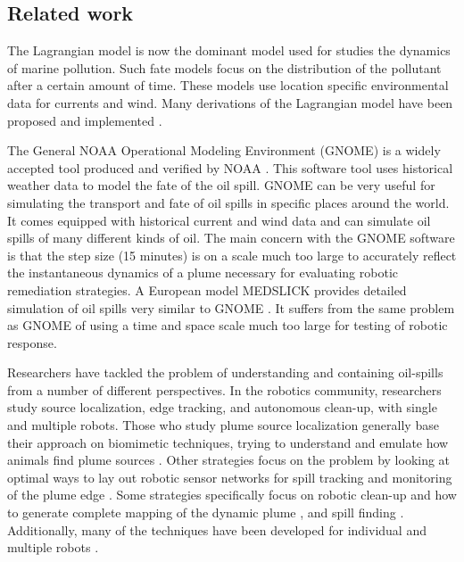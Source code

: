 \documentclass[ letterpaper, 10 pt, conference]{ieeeconf}  %
\begin{document}
\subsection{Related work}\label{part:relatedWork}


The Lagrangian model is now the dominant model used for studies the dynamics of marine pollution.  Such fate models focus on the distribution of the pollutant after a certain amount of time. These models use location specific environmental data for currents and wind.  Many derivations of the Lagrangian model have been proposed and implemented  \cite{ASCE1996}.  


The General NOAA Operational Modeling Environment (GNOME) is a widely accepted tool produced and verified by NOAA \cite{GNOME}.  This software tool uses historical weather data to model the fate of the oil spill.  GNOME can be very useful for simulating the transport and fate of oil spills in specific places around the world.  It comes equipped with historical current and wind data and can simulate oil spills of many different kinds of oil. 
The main concern with the GNOME software is that the step size (15 minutes) is on a scale much too large to accurately reflect the instantaneous dynamics of a plume necessary for evaluating robotic remediation strategies.  A European model MEDSLICK provides detailed simulation of oil spills very similar to GNOME \cite{Dominicis2013} \cite{Dominicis2013a}. It suffers from the same problem as GNOME of using a time and space scale much too large for testing of robotic response.  

Researchers have tackled the problem of understanding and containing oil-spills from a number of different perspectives.  In the robotics community, researchers study source localization, edge tracking, and autonomous clean-up, with single and multiple robots.  Those who study plume source localization generally base their approach on biomimetic techniques, trying to understand and emulate how animals find plume sources \cite{Farrell2003}\cite{Li2006}\cite{Webster2001a}.  Other strategies focus on the problem by looking at optimal ways to lay out robotic sensor networks for spill tracking and monitoring of the plume edge \cite{Grasso2001}\cite{Li2014}\cite{Zhang2007}\cite{Sahyoun2010}.  Some strategies specifically focus on robotic clean-up and how to generate complete mapping of the dynamic plume \cite{Jin2014}\cite{Zarzhitsky2005}, and spill finding \cite{Marjovi2014}.  Additionally, many of the techniques have been developed for individual and multiple robots \cite{Grasso2001}\cite{Li2014}\cite{Marjovi2014} \cite{Zarzhitsky2005}.   
\end{document}
